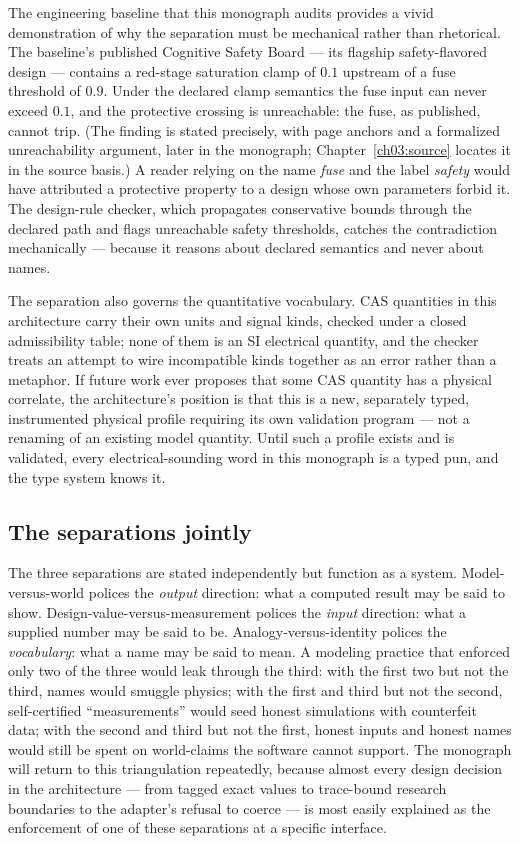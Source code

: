 The engineering baseline that this monograph audits provides a vivid
demonstration of why the separation must be mechanical rather than
rhetorical. The baseline's published Cognitive Safety Board --- its flagship
safety-flavored design --- contains a red-stage saturation clamp of $0.1$
upstream of a fuse threshold of $0.9$. Under the declared clamp semantics
the fuse input can never exceed $0.1$, and the protective crossing is
unreachable: the fuse, as published, cannot trip. (The finding is stated
precisely, with page anchors and a formalized unreachability argument, later
in the monograph; Chapter~\ref{ch03:source} locates it in the source basis.)
A reader relying on the name \emph{fuse} and the label \emph{safety} would
have attributed a protective property to a design whose own parameters
forbid it. The design-rule checker, which propagates conservative bounds
through the declared path and flags unreachable safety thresholds, catches
the contradiction mechanically --- because it reasons about declared
semantics and never about names.

The separation also governs the quantitative vocabulary. CAS quantities in
this architecture carry their own units and signal kinds, checked under a
closed admissibility table; none of them is an SI electrical quantity, and
the checker treats an attempt to wire incompatible kinds together as an
error rather than a metaphor. If future work ever proposes that some CAS
quantity has a physical correlate, the architecture's position is that this
is a new, separately typed, instrumented physical profile requiring its own
validation program --- not a renaming of an existing model quantity. Until
such a profile exists and is validated, every electrical-sounding word in
this monograph is a typed pun, and the type system knows it.

\subsection{The separations jointly}\label{ch01:sep:jointly}

The three separations are stated independently but function as a system.
Model-versus-world polices the \emph{output} direction: what a computed
result may be said to show. Design-value-versus-measurement polices the
\emph{input} direction: what a supplied number may be said to be.
Analogy-versus-identity polices the \emph{vocabulary}: what a name may be
said to mean. A modeling practice that enforced only two of the three would
leak through the third: with the first two but not the third, names would
smuggle physics; with the first and third but not the second,
self-certified ``measurements'' would seed honest simulations with
counterfeit data; with the second and third but not the first, honest inputs
and honest names would still be spent on world-claims the software cannot
support. The monograph will return to this triangulation repeatedly, because
almost every design decision in the architecture --- from tagged exact
values to trace-bound research boundaries to the adapter's refusal to coerce
--- is most easily explained as the enforcement of one of these separations
at a specific interface.

